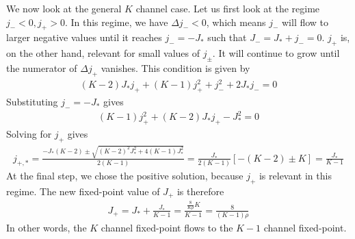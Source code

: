 \documentclass{revtex4-2}
\numberwithin{equation}{section}
\begin{document}
We now look at the general \(K\) channel case. Let us first look at the regime \(j_- < 0, j_+ > 0\). In this regime, we have \(\Delta j_- < 0\), which means \(j_-\) will flow to larger negative values until it reaches \(j_- = -J_*\) such that \(J_- = J_* + j_- = 0\). \(j_+\) is, on the other hand, relevant for small values of \(j_\pm\). It will continue to grow until the numerator of \(\Delta j_+\) vanishes. This condition is given by
\begin{equation}\begin{aligned}
	\left(K - 2\right)J_*j_+ + (K-1)j_+^2 + j_-^2 + 2J_* j_- = 0
\end{aligned}\end{equation}
Substituting \(j_- = -J_*\) gives
\begin{equation}\begin{aligned}
	(K-1)j_+^2 + \left(K - 2\right)J_*j_+ - J_*^2 = 0
\end{aligned}\end{equation}
Solving for \(j_+\) gives
\begin{equation}\begin{aligned}
	j_{+,*} = \frac{-J_*(K-2) \pm \sqrt{(K-2)^2 J_*^2 + 4(K-1)J_*^2}}{2(K-1)} = \frac{J_*}{2(K-1)}\left[-(K-2) \pm K\right] = \frac{J_*}{K-1}
\end{aligned}\end{equation}
At the final step, we chose the positive solution, because \(j_+\) is relevant in this regime. The new fixed-point value of \(J_+\) is therefore
\begin{equation}\begin{aligned}
	J_+ = J_* + \frac{J_*}{K-1} = \frac{\frac{8}{K \rho} K}{K - 1} = \frac{8}{(K-1)\rho}
\end{aligned}\end{equation}
In other words, the \(K\) channel fixed-point flows to the \(K-1\) channel fixed-point.
\end{document}
